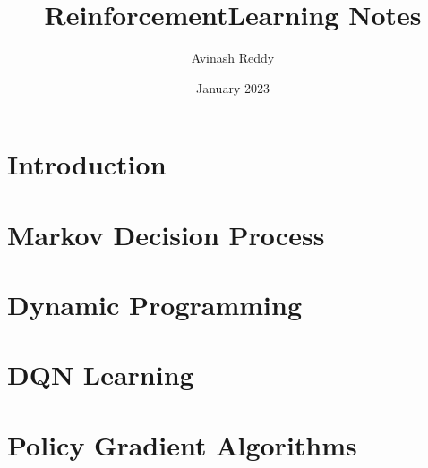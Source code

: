 \documentclass{article}
\title{ReinforcementLearning Notes}
\author{Avinash Reddy}
\date{January 2023}
\begin{document}
\maketitle

\section{Introduction}


\section{Markov Decision Process}


\section{Dynamic Programming}


\section{DQN Learning}


\section{Policy Gradient Algorithms}

\end{document}
